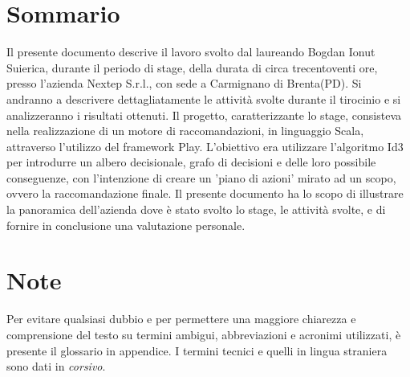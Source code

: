 
\cleardoublepage
{}
{}
\begingroup
\let\clearpage\relax
\let\cleardoublepage\relax
\let\cleardoublepage\relax

\chapter*{Sommario}

Il presente documento descrive il lavoro svolto dal laureando Bogdan Ionut Suierica, durante il periodo di stage, della durata di circa trecentoventi ore, presso l'azienda Nextep S.r.l., con sede a Carmignano di Brenta(PD). Si andranno a descrivere dettagliatamente le attività svolte durante il tirocinio e si analizzeranno i risultati ottenuti. Il progetto, caratterizzante lo stage, consisteva nella realizzazione di un motore di raccomandazioni, in linguaggio Scala, attraverso l'utilizzo del \gls{framework} Play. L'obiettivo era utilizzare l'algoritmo Id3 per introdurre un albero decisionale, grafo di decisioni e delle loro possibile conseguenze, con l'intenzione di creare un 'piano di azioni' mirato ad un scopo, ovvero la raccomandazione finale.
Il presente documento ha lo scopo di illustrare la panoramica dell'azienda dove è stato svolto lo stage, le attività svolte, e di fornire in conclusione una valutazione personale.

\chapter*{Note}
Per evitare qualsiasi dubbio e per permettere una maggiore chiarezza e comprensione del testo su termini ambigui, abbreviazioni e acronimi utilizzati, è presente il glossario in appendice. I termini tecnici e quelli in lingua straniera sono dati in \textit{corsivo}.

%
%

\endgroup			

\vfill

